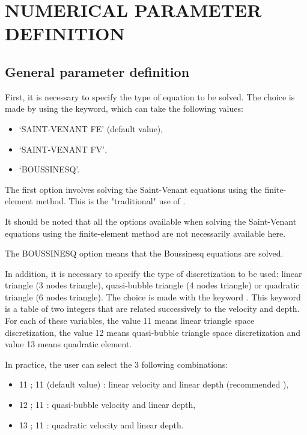 

\chapter{  NUMERICAL PARAMETER DEFINITION}
\label{ch:num:par:def}

\section{General parameter definition}

 First, it is necessary to specify the type of equation to be solved. The choice is made by using the  keyword, which can take the following values:

\begin{itemize}
\item  `SAINT-VENANT FE' (default value),

\item  `SAINT-VENANT FV',

\item  `BOUSSINESQ'.
\end{itemize}

 The first option involves solving the Saint-Venant equations using the finite-element method. This is the "traditional" use of .

It should be noted that all the options available when solving the Saint-Venant equations using the finite-element method are not necessarily available here.

 The BOUSSINESQ option means that the Boussinesq equations are solved.

 In addition, it is necessary to specify the type of discretization to be used: linear triangle (3 nodes triangle), quasi-bubble triangle (4 nodes triangle) or quadratic triangle (6 nodes triangle). The choice is made with the keyword . This keyword is a table of two integers that are related successively to the velocity and depth. For each of these variables, the value 11 means linear triangle space discretization, the value 12 means quasi-bubble triangle space discretization and value 13 means quadratic element.

  In practice, the user can select the 3 following combinations:

\begin{itemize}
\item  11 ; 11 (default value) : linear velocity and linear depth (recommended ),

\item  12 ; 11 : quasi-bubble velocity and linear depth,

\item  13 ; 11 : quadratic velocity and linear depth.
\end{itemize}

